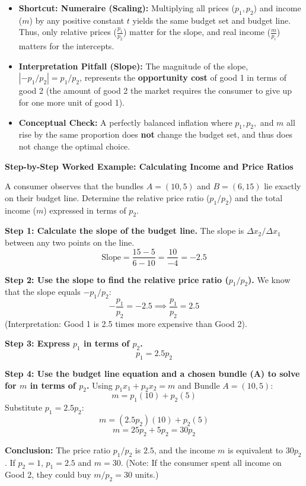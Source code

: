 \documentclass{article}
\begin{document}
\begin{itemize}
    \item \textbf{Shortcut: Numeraire (Scaling):} Multiplying all prices ($p_1, p_2$) and income ($m$) by any positive constant $t$ yields the same budget set and budget line. Thus, only relative prices ($\frac{p_1}{p_2}$) matter for the slope, and real income ($\frac{m}{p_i}$) matters for the intercepts.
    \item \textbf{Interpretation Pitfall (Slope):} The magnitude of the slope, $|-p_1/p_2| = p_1/p_2$, represents the \textbf{opportunity cost} of good 1 in terms of good 2 (the amount of good 2 the market requires the consumer to give up for one more unit of good 1).
    \item \textbf{Conceptual Check:} A perfectly balanced inflation where $p_1, p_2,$ and $m$ all rise by the same proportion does \textbf{not} change the budget set, and thus does not change the optimal choice.
\end{itemize}

\textbf{Step-by-Step Worked Example: Calculating Income and Price Ratios}

A consumer observes that the bundles $A=(10, 5)$ and $B=(6, 15)$ lie exactly on their budget line. Determine the relative price ratio ($p_1/p_2$) and the total income ($m$) expressed in terms of $p_2$.

\textbf{Step 1: Calculate the slope of the budget line.} The slope is $\Delta x_2 / \Delta x_1$ between any two points on the line. $$\text{Slope} = \frac{15 - 5}{6 - 10} = \frac{10}{-4} = -2.5$$

\textbf{Step 2: Use the slope to find the relative price ratio ($p_1/p_2$).} We know that the slope equals $-p_1/p_2$: $$-\frac{p_1}{p_2} = -2.5 \implies \frac{p_1}{p_2} = 2.5$$ (Interpretation: Good 1 is 2.5 times more expensive than Good 2).

\textbf{Step 3: Express $p_1$ in terms of $p_2$.} $$p_1 = 2.5 p_2$$

\textbf{Step 4: Use the budget line equation and a chosen bundle (A) to solve for $m$ in terms of $p_2$.} Using $p_1x_1 + p_2x_2 = m$ and Bundle $A=(10, 5)$: $$m = p_1(10) + p_2(5)$$ Substitute $p_1 = 2.5 p_2$: $$m = (2.5 p_2)(10) + p_2(5)$$ $$m = 25 p_2 + 5 p_2 = 30 p_2$$

\textbf{Conclusion:} The price ratio $p_1/p_2$ is $2.5$, and the income $m$ is equivalent to $30 p_2$. If $p_2=1$, $p_1=2.5$ and $m=30$. (Note: If the consumer spent all income on Good 2, they could buy $m/p_2 = 30$ units.)
\end{document}

